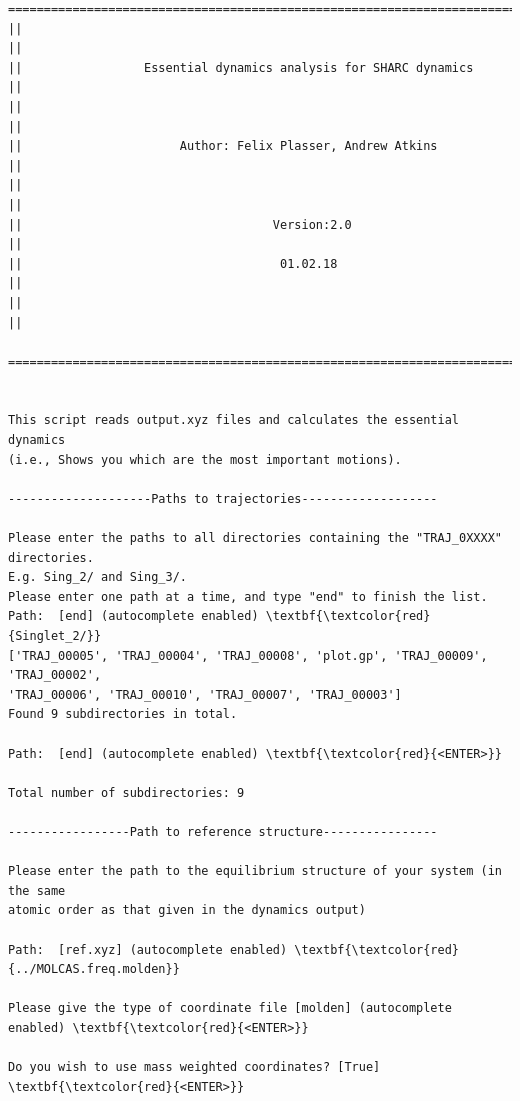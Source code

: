 \documentclass[a4paper,11pt,DIV=15,openany]{scrbook}
\begin{document}
\begin{oframed}
\footnotesize\begin{Verbatim}[commandchars=\\\{\}]
  ================================================================================
||                                                                                ||
||                 Essential dynamics analysis for SHARC dynamics                 ||
||                                                                                ||
||                      Author: Felix Plasser, Andrew Atkins                      ||
||                                                                                ||
||                                   Version:2.0                                  ||
||                                    01.02.18                                    ||
||                                                                                ||
  ================================================================================


This script reads output.xyz files and calculates the essential dynamics 
(i.e., Shows you which are the most important motions).
  
--------------------Paths to trajectories-------------------

Please enter the paths to all directories containing the "TRAJ_0XXXX" directories.
E.g. Sing_2/ and Sing_3/. 
Please enter one path at a time, and type "end" to finish the list.
Path:  [end] (autocomplete enabled) \textbf{\textcolor{red}{Singlet_2/}}
['TRAJ_00005', 'TRAJ_00004', 'TRAJ_00008', 'plot.gp', 'TRAJ_00009', 'TRAJ_00002', 
'TRAJ_00006', 'TRAJ_00010', 'TRAJ_00007', 'TRAJ_00003']
Found 9 subdirectories in total.

Path:  [end] (autocomplete enabled) \textbf{\textcolor{red}{<ENTER>}}

Total number of subdirectories: 9

-----------------Path to reference structure----------------

Please enter the path to the equilibrium structure of your system (in the same
atomic order as that given in the dynamics output)

Path:  [ref.xyz] (autocomplete enabled) \textbf{\textcolor{red}{../MOLCAS.freq.molden}}

Please give the type of coordinate file [molden] (autocomplete enabled) \textbf{\textcolor{red}{<ENTER>}}

Do you wish to use mass weighted coordinates? [True] \textbf{\textcolor{red}{<ENTER>}}


\end{Verbatim}
\end{oframed}
\end{document}
